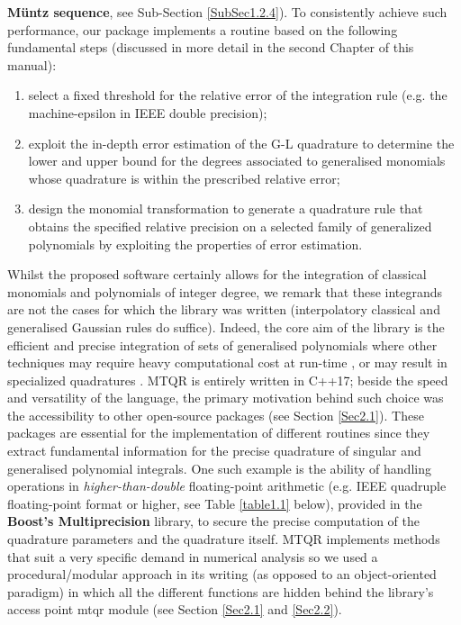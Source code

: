 \documentclass[a4paper, twosided]{book}
\begin{document}
\color{poliDarkBlue} \textbf{Müntz sequence}\color{black}, see Sub-Section \ref{SubSec1.2.4}). To consistently achieve such performance, our package implements a routine based on the following fundamental steps (discussed in more detail in the second Chapter of this manual):
\begin{enumerate}
    \item select a fixed threshold for the relative error of the integration rule (e.g. the machine-epsilon in IEEE double precision);
    \item exploit the in-depth error estimation of the G-L quadrature to determine the lower and upper bound for the degrees associated to generalised monomials whose quadrature is within the prescribed relative error;
    \item design the monomial transformation to generate a quadrature rule that obtains the specified relative precision on a selected family of generalized polynomials by exploiting the properties of error estimation.
\end{enumerate}

\noindent
Whilst the proposed software certainly allows for the integration of classical monomials and polynomials of integer degree, we remark that these integrands are not the cases for which the library was written (interpolatory classical and generalised Gaussian rules do suffice). Indeed, the core aim of the library is the efficient and precise integration of sets of generalised polynomials where other techniques may require heavy computational cost at run-time \cite{Gautschi94}, or may result in specialized quadratures \cite{Ma1996,Milovanovic2015}. MTQR is entirely written in C++17; beside the speed and versatility of the language, the primary motivation behind such choice was the accessibility to other open-source packages (see Section \ref{Sec2.1}). These packages are essential for the implementation of different routines since they extract fundamental information for the precise quadrature of singular and generalised polynomial integrals. One such example is the ability of handling operations in \textsl{higher-than-double} floating-point arithmetic (e.g. IEEE quadruple floating-point format or higher, see Table \ref{table1.1} below), provided in the \color{poliDarkBlue} \textbf{Boost's Multiprecision} \color{black} library, to secure the precise computation of the quadrature parameters and the quadrature itself. MTQR implements methods that suit a very specific demand in numerical analysis so we used a procedural/modular approach in its writing (as opposed to an object-oriented paradigm) in which all the different functions are hidden behind the library's access point \colorbox{poliGrayBlue}{mtqr} \color{black} module (see Section \ref{Sec2.1} and \ref{Sec2.2}).
\end{document}
